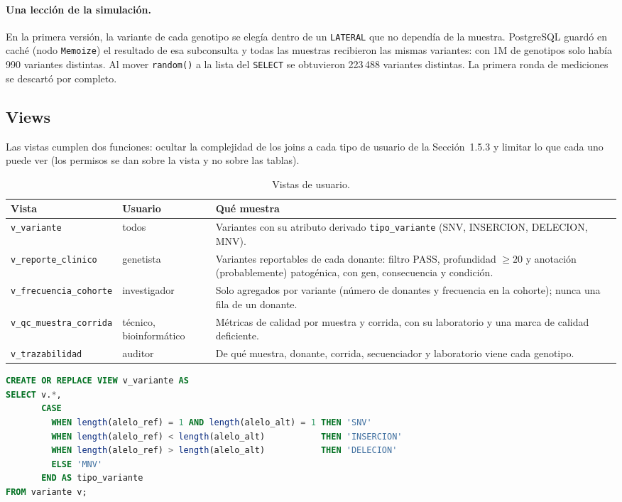 \paragraph{Una lección de la simulación.} En la primera versión, la variante de cada genotipo se elegía dentro de
un \texttt{LATERAL} que no dependía de la muestra. PostgreSQL guardó en caché (nodo \texttt{Memoize}) el resultado
de esa subconsulta y todas las muestras recibieron las mismas variantes: con 1M de genotipos solo había 990
variantes distintas. Al mover \texttt{random()} a la lista del \texttt{SELECT} se obtuvieron
223\,488 variantes distintas. La primera ronda de mediciones se descartó por completo.

\subsection{Views}\label{sec:vistas}

Las vistas cumplen dos funciones: ocultar la complejidad de los joins a cada tipo de usuario de la
Sección~1.5.3 y limitar lo que cada uno puede ver (los permisos se dan sobre la vista y no sobre las tablas).

\begin{table}[H]
\centering\small
\begin{tabular}{@{}>{\raggedright\arraybackslash}p{3.6cm}>{\raggedright\arraybackslash}p{2.4cm}>{\raggedright\arraybackslash}p{8.4cm}@{}}
\toprule
Vista & Usuario & Qué muestra \\
\midrule
\texttt{v\_\allowbreak{}variante} & todos & Variantes con su atributo derivado \texttt{tipo\_\allowbreak{}variante} (SNV, INSERCION, DELECION, MNV). \\
\texttt{v\_\allowbreak{}reporte\_\allowbreak{}clinico} & genetista & Variantes reportables de cada donante: filtro PASS, profundidad $\geq 20$ y anotación (probablemente) patogénica, con gen, consecuencia y condición. \\
\texttt{v\_\allowbreak{}frecuencia\_\allowbreak{}cohorte} & investigador & Solo agregados por variante (número de donantes y frecuencia en la cohorte); nunca una fila de un donante. \\
\texttt{v\_\allowbreak{}qc\_\allowbreak{}muestra\_\allowbreak{}corrida} & técnico, bioinformático & Métricas de calidad por muestra y corrida, con su laboratorio y una marca de calidad deficiente. \\
\texttt{v\_\allowbreak{}trazabilidad} & auditor & De qué muestra, donante, corrida, secuenciador y laboratorio viene cada genotipo. \\
\bottomrule
\end{tabular}
\caption{Vistas de usuario.}
\end{table}
\begin{lstlisting}[language=SQL,caption={Vista con el atributo derivado}]
CREATE OR REPLACE VIEW v_variante AS
SELECT v.*,
       CASE
         WHEN length(alelo_ref) = 1 AND length(alelo_alt) = 1 THEN 'SNV'
         WHEN length(alelo_ref) < length(alelo_alt)           THEN 'INSERCION'
         WHEN length(alelo_ref) > length(alelo_alt)           THEN 'DELECION'
         ELSE 'MNV'
       END AS tipo_variante
FROM variante v;
\end{lstlisting}

